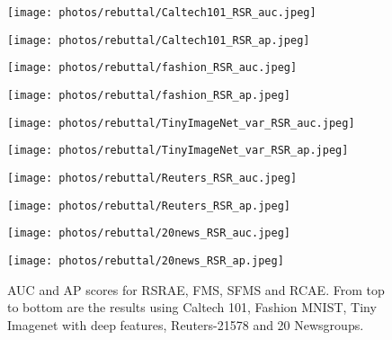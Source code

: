 \documentclass{article} \usepackage{iclr2020_conference,times}
\begin{document}
\begin{figure}[htbp]
\centering
\begin{minipage}[t]{0.48\textwidth}
\centering
\texttt{[image: photos/rebuttal/Caltech101\_RSR\_auc.jpeg]}
\end{minipage}
\begin{minipage}[t]{0.48\textwidth}
\centering
\texttt{[image: photos/rebuttal/Caltech101\_RSR\_ap.jpeg]}
\end{minipage}


\centering
\begin{minipage}[t]{0.48\textwidth}
\centering
\texttt{[image: photos/rebuttal/fashion\_RSR\_auc.jpeg]}
\end{minipage}
\begin{minipage}[t]{0.48\textwidth}
\centering
\texttt{[image: photos/rebuttal/fashion\_RSR\_ap.jpeg]}
\end{minipage}


\centering
\begin{minipage}[t]{0.48\textwidth}
\centering
\texttt{[image: photos/rebuttal/TinyImageNet\_var\_RSR\_auc.jpeg]}
\end{minipage}
\begin{minipage}[t]{0.48\textwidth}
\centering
\texttt{[image: photos/rebuttal/TinyImageNet\_var\_RSR\_ap.jpeg]}
\end{minipage}




\centering
\begin{minipage}[t]{0.48\textwidth}
\centering
\texttt{[image: photos/rebuttal/Reuters\_RSR\_auc.jpeg]}
\end{minipage}
\begin{minipage}[t]{0.48\textwidth}
\centering
\texttt{[image: photos/rebuttal/Reuters\_RSR\_ap.jpeg]}
\end{minipage}



\centering
\begin{minipage}[t]{0.48\textwidth}
\centering
\texttt{[image: photos/rebuttal/20news\_RSR\_auc.jpeg]}
\end{minipage}
\begin{minipage}[t]{0.48\textwidth}
\centering
\texttt{[image: photos/rebuttal/20news\_RSR\_ap.jpeg]}
\end{minipage}


\caption{AUC and AP scores for RSRAE, FMS, SFMS and RCAE. From top to bottom are the results using Caltech 101, Fashion MNIST, Tiny Imagenet with deep features, Reuters-21578 and 20 Newsgroups.}
\label{fig:RSRandRCAE}

\end{figure}
\end{document}
